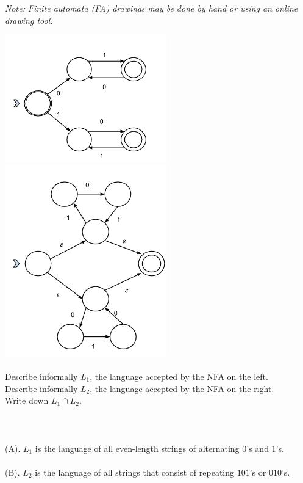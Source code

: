 \documentclass[solution, letterpaper]{cs121}
\begin{document}
\textit{Note: Finite automata (FA) drawings may be done by hand or using an online drawing tool.}

\includegraphics[width=7.0cm]{1-2a.png} \includegraphics[width=7.0cm]{1-2b.png}\\\\
\subproblem Describe informally $L_1$, the language accepted by the NFA on the left.\\
\subproblem Describe informally $L_2$, the language accepted by the NFA on the right.\\
\subproblem Write down $L_1 \cap L_2$.
\\\\
\\\\(A). $L_1$ is the language of all even-length strings of alternating $0$'s and $1$'s.
\\\\(B). $L_2$ is the language of all strings that consist of repeating $101$'s or $010$'s.  
\end{document}
